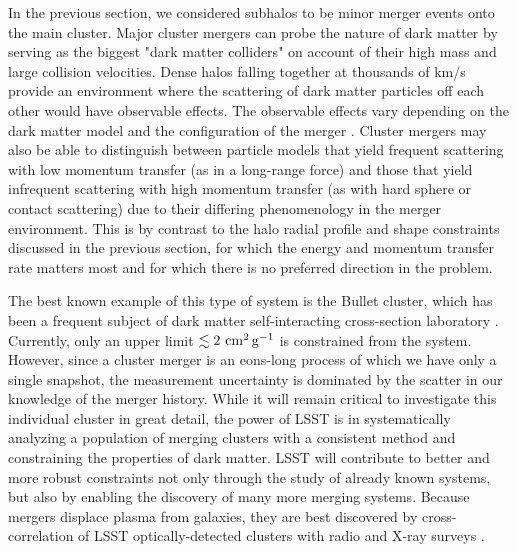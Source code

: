 In the previous section, we considered subhalos to be minor merger events onto the main cluster.  Major cluster mergers can probe the nature of dark matter by serving as the biggest "dark matter colliders" on account of their high mass and large collision velocities. Dense halos falling together at thousands of km/s provide an environment where the scattering of dark matter particles off each other would have observable effects.  The observable effects vary depending on the dark matter model and the configuration of the merger \citep{Kim:2016ujt}.  %
Cluster mergers may also be able to distinguish between particle models that yield frequent scattering with low momentum transfer (as in a long-range force) and those that yield infrequent scattering with high momentum transfer (as with hard sphere or contact scattering) due to their differing phenomenology in the merger environment.  This is by contrast to the halo radial profile and shape constraints discussed in the previous section, for which the energy and momentum transfer rate matters most and for which there is no preferred direction in the problem.

The best known example of this type of system is the Bullet cluster, which has been a frequent subject of dark matter self-interacting cross-section laboratory \citep{2008ApJ...679.1173R,2017MNRAS.465..569R}. Currently, only an upper limit  $\lesssim 2 \mathrm{\,\mathrm{\,cm}^2\mathrm{\,g}^{-1}}$ is constrained from the system.
However, since a cluster merger is an eons-long process of which we have only a single snapshot, the measurement uncertainty is dominated by the scatter in our knowledge of the merger history. While it will remain critical to investigate this individual cluster in great detail, the power of LSST is in systematically analyzing a population of merging clusters with a consistent method and constraining the properties of dark matter.
LSST will contribute to better and more robust constraints not only through the study of already known systems, but also by enabling the discovery of many more merging systems. Because mergers displace plasma from galaxies, they are best discovered by cross-correlation of LSST optically-detected clusters with radio and X-ray surveys \citep{golovich2018,Wilber2018}.

